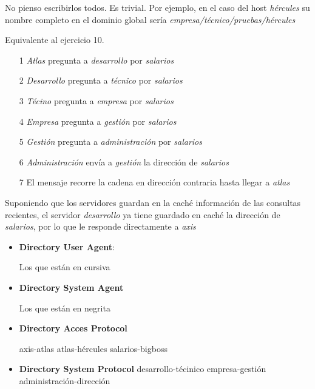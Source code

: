 \begin{problem}[12]
\solution

\yoP

\spart

No pienso escribirlos todos. Es trivial. Por ejemplo, en el caso del host \textit{hércules} su nombre completo en el dominio global sería \textit{empresa/técnico/pruebas/hércules}

\spart

Equivalente al ejercicio 10.

\begin{enumerate}
\item[1] \textit{Atlas} pregunta a \textit{desarrollo} por \textit{salarios}
\item[2] \textit{Desarrollo} pregunta a \textit{técnico} por \textit{salarios}
\item[3] \textit{Técino} pregunta a \textit{empresa} por \textit{salarios}
\item[4] \textit{Empresa} pregunta a \textit{gestión} por \textit{salarios}
\item[5] \textit{Gestión} pregunta a \textit{administración} por \textit{salarios}
\item[6] \textit{Administración} envía a \textit{gestión} la dirección de \textit{salarios}
\item[7] El mensaje recorre la cadena en dirección contraria hasta llegar a \textit{atlas}
\end{enumerate}

\spart

Suponiendo que los servidores guardan en la caché información de las consultas recientes, el servidor \textit{desarrollo} ya tiene guardado en caché la dirección de \textit{salarios}, por lo que le responde directamente a \textit{axis}

\spart

\begin{itemize}
\item \textbf{Directory User Agent}:

Los que están en cursiva
\item \textbf{Directory System Agent}

Los que están en negrita
\item \textbf{Directory Acces Protocol}

\subitem axis-atlas
\subitem atlas-hércules
\subitem salarios-bigboss

\item \textbf{Directory System Protocol}
\subitem desarrollo-técinico
\subitem empresa-gestión
\subitem administración-dirección
\end{itemize}


\end{problem}
